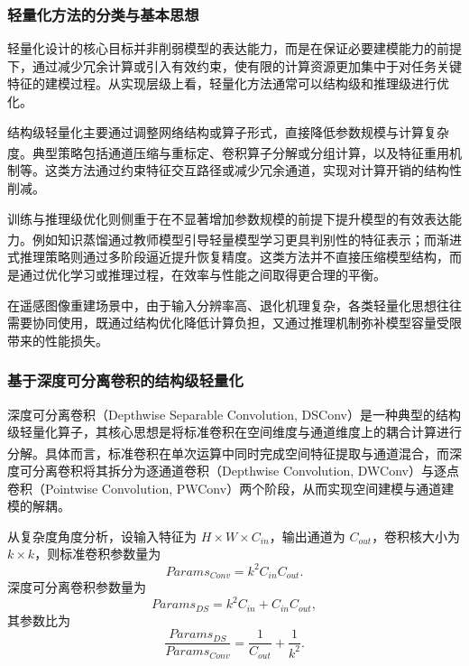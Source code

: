 \subsubsection{轻量化方法的分类与基本思想}

轻量化设计的核心目标并非削弱模型的表达能力，而是在保证必要建模能力的前提下，通过减少冗余计算或引入有效约束，使有限的计算资源更加集中于对任务关键特征的建模过程。从实现层级上看，轻量化方法通常可以结构级和推理级进行优化。

结构级轻量化主要通过调整网络结构或算子形式，直接降低参数规模与计算复杂度。典型策略包括通道压缩与重标定\textsuperscript{\cite{hu2018squeeze}}、卷积算子分解或分组计算\textsuperscript{\cite{xie2017aggregated,howard2019searching}}，以及特征重用机制等。这类方法通过约束特征交互路径或减少冗余通道，实现对计算开销的结构性削减。

训练与推理级优化则侧重于在不显著增加参数规模的前提下提升模型的有效表达能力。例如知识蒸馏\textsuperscript{\cite{hinton2015distilling}}通过教师模型引导轻量模型学习更具判别性的特征表示；而渐进式推理策略则通过多阶段逼近提升恢复精度。这类方法并不直接压缩模型结构，而是通过优化学习或推理过程，在效率与性能之间取得更合理的平衡。

在遥感图像重建场景中，由于输入分辨率高、退化机理复杂，各类轻量化思想往往需要协同使用，既通过结构优化降低计算负担，又通过推理机制弥补模型容量受限带来的性能损失。

\subsubsection{基于深度可分离卷积的结构级轻量化}

深度可分离卷积（Depthwise Separable Convolution, DSConv）是一种典型的结构级轻量化算子，其核心思想是将标准卷积在空间维度与通道维度上的耦合计算进行分解\textsuperscript{\cite{chollet2017xception,howard2019searching}}。具体而言，标准卷积在单次运算中同时完成空间特征提取与通道混合，而深度可分离卷积将其拆分为逐通道卷积（Depthwise Convolution, DWConv）与逐点卷积（Pointwise Convolution, PWConv）两个阶段，从而实现空间建模与通道建模的解耦。

从复杂度角度分析，设输入特征为 $H\times W\times C_{in}$，输出通道为 $C_{out}$，卷积核大小为 $k\times k$，则标准卷积参数量为
\begin{equation}
{Params}_{Conv}=k^{2} C_{in} C_{out}.
\end{equation}
深度可分离卷积参数量为
\begin{equation}
{Params}_{DS}=k^{2} C_{in}+C_{in} C_{out},
\end{equation}
其参数比为
\begin{equation}
\frac{{Params}_{DS}}{{Params}_{Conv}}=\frac{1}{C_{out}}+\frac{1}{k^{2}}.
\end{equation}

